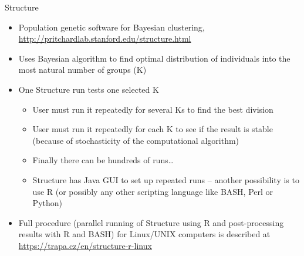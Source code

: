 \documentclass[compress, ucs, xelatex, 11pt, xcolor=svgnames,
  hyperref={
    bookmarks=true,
    unicode=true,
    colorlinks=true,
    pdftitle={Molecular data in R},
    plainpages=false,
    pdfauthor={Vojtech Zeisek},
    pdfsubject={Course about phylogeny and evolution in R},
    pdfcreator={XeLaTeX},
    pdfkeywords={R, evolution, phylogeny, molecular data},
    linkcolor=Tomato,
    anchorcolor=SaddleBrown,
    citecolor=Goldenrod,
    filecolor=DarkMagenta,
    menucolor=Sienna,
    urlcolor=DarkTurquoise,
    pdftex},
  url={hyphens, lowtilde} %
  ]{beamer}
\begin{document}
\begin{frame}{Structure}
  \begin{itemize}
    \item Population genetic software for Bayesian clustering, \url{http://pritchardlab.stanford.edu/structure.html}
    \item Uses Bayesian algorithm to find optimal distribution of individuals into the most natural number of groups (K)
    \item One Structure run tests one selected K
    \begin{itemize}
      \item User must run it repeatedly for several Ks to find the best division
      \item User must run it repeatedly for each K to see if the result is stable (because of stochasticity of the computational algorithm)
      \item Finally there can be hundreds of runs\ldots
      \item Structure has Java GUI to set up repeated runs -- another possibility is to use R (or possibly any other scripting language like BASH, Perl or Python)
    \end{itemize}
    \item Full procedure (parallel running of Structure using R and post-processing results with R and BASH) for Linux/UNIX computers is described at \url{https://trapa.cz/en/structure-r-linux}
  \end{itemize}
\end{frame}
\end{document}
